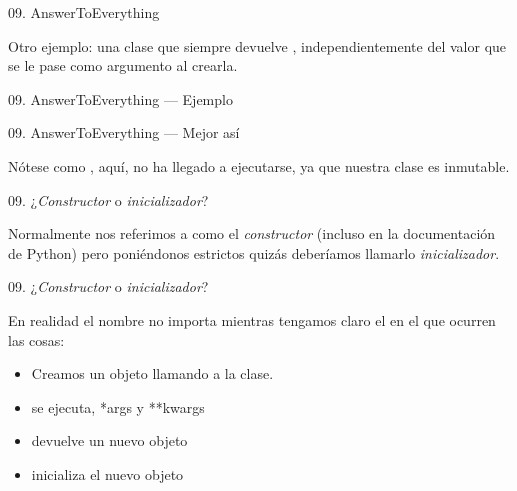 \begin{frame}{09. AnswerToEverything}
  \begin{block}{}
    \centering
    Otro ejemplo: una clase que siempre devuelve ,
    independientemente del valor que se le pase como argumento al
    crearla.
  \end{block}
\end{frame}

\begin{frame}{09. AnswerToEverything — Ejemplo}
  \scriptsize
\end{frame}

\begin{frame}{09. AnswerToEverything — Mejor así}
  \footnotesize

  \begin{center}
    \small
    Nótese como , aquí, no ha llegado a
    ejecutarse, ya que nuestra clase es inmutable.
  \end{center}
\end{frame}

\begin{frame}{09. ¿\textit{Constructor} o \textit{inicializador}?}
  \begin{block}{}
    \center
    Normalmente nos referimos a  como el
    \textit{constructor} (incluso en la documentación de Python) pero
    poniéndonos estrictos quizás deberíamos llamarlo
    \textit{inicializador}.
  \end{block}
\end{frame}

\begin{frame}{09. ¿\textit{Constructor} o \textit{inicializador}?}
  \begin{center}
    En realidad el nombre no importa mientras tengamos claro el
     en el que ocurren las cosas:
  \end{center}

  \begin{itemize}
    \item Creamos un objeto llamando a la clase.
    \item {} se ejecuta, *args y **kwargs
    \item {} devuelve un nuevo objeto
    \item {} inicializa el nuevo objeto
  \end{itemize}
\end{frame}

